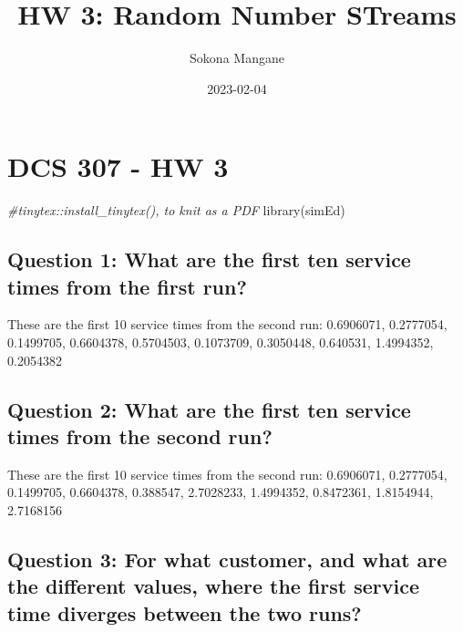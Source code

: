 \documentclass[
]{article}
\title{HW 3: Random Number STreams}
\author{Sokona Mangane}
\date{2023-02-04}
\newenvironment{Shaded}{\begin{snugshade}}{\end{snugshade}}
\newcommand{\CommentTok}[1]{\textcolor[rgb]{0.56,0.35,0.01}{\textit{#1}}}
\newcommand{\FunctionTok}[1]{\textcolor[rgb]{0.00,0.00,0.00}{#1}}
\newcommand{\NormalTok}[1]{#1}
\begin{document}
\maketitle

\hypertarget{dcs-307---hw-3}{%
\section{DCS 307 - HW 3}\label{dcs-307---hw-3}}

\begin{Shaded}
\begin{Highlighting}[]
\CommentTok{\#tinytex::install\_tinytex(), to knit as a PDF}
\FunctionTok{library}\NormalTok{(simEd)}
\end{Highlighting}
\end{Shaded}

\hypertarget{question-1-what-are-the-first-ten-service-times-from-the-first-run}{%
\subsection{Question 1: What are the first ten service times from the
first
run?}\label{question-1-what-are-the-first-ten-service-times-from-the-first-run}}

These are the first 10 service times from the second run: 0.6906071,
0.2777054, 0.1499705, 0.6604378, 0.5704503, 0.1073709, 0.3050448,
0.640531, 1.4994352, 0.2054382

\hypertarget{question-2-what-are-the-first-ten-service-times-from-the-second-run}{%
\subsection{Question 2: What are the first ten service times from the
second
run?}\label{question-2-what-are-the-first-ten-service-times-from-the-second-run}}

These are the first 10 service times from the second run: 0.6906071,
0.2777054, 0.1499705, 0.6604378, 0.388547, 2.7028233, 1.4994352,
0.8472361, 1.8154944, 2.7168156

\hypertarget{question-3-for-what-customer-and-what-are-the-different-values-where-the-first-service-time-diverges-between-the-two-runs}{%
\subsection{Question 3: For what customer, and what are the different
values, where the first service time diverges between the two
runs?}\label{question-3-for-what-customer-and-what-are-the-different-values-where-the-first-service-time-diverges-between-the-two-runs}}
\end{document}
